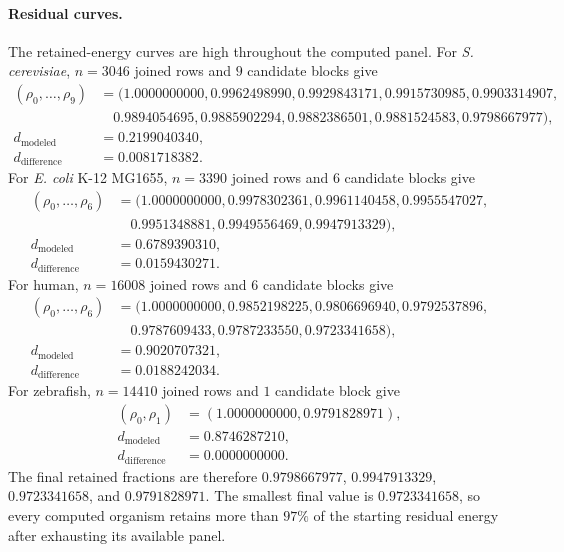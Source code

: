 \paragraph{Residual curves.}
The retained-energy curves are high throughout the computed panel.  For \textit{S. cerevisiae}, $n=3046$ joined rows and $9$ candidate blocks give
$$
\begin{aligned}
(\rho_0,\ldots,\rho_9)
&=(1.0000000000,0.9962498990,0.9929843171,0.9915730985,0.9903314907,\\
&\quad 0.9894054695,0.9885902294,0.9882386501,0.9881524583,0.9798667977),\\
d_{\mathrm{modeled}}&=0.2199040340,\\
d_{\mathrm{difference}}&=0.0081718382.
\end{aligned}
$$
For \textit{E. coli} K-12 MG1655, $n=3390$ joined rows and $6$ candidate blocks give
$$
\begin{aligned}
(\rho_0,\ldots,\rho_6)
&=(1.0000000000,0.9978302361,0.9961140458,0.9955547027,\\
&\quad 0.9951348881,0.9949556469,0.9947913329),\\
d_{\mathrm{modeled}}&=0.6789390310,\\
d_{\mathrm{difference}}&=0.0159430271.
\end{aligned}
$$
For human, $n=16008$ joined rows and $6$ candidate blocks give
$$
\begin{aligned}
(\rho_0,\ldots,\rho_6)
&=(1.0000000000,0.9852198225,0.9806696940,0.9792537896,\\
&\quad 0.9787609433,0.9787233550,0.9723341658),\\
d_{\mathrm{modeled}}&=0.9020707321,\\
d_{\mathrm{difference}}&=0.0188242034.
\end{aligned}
$$
For zebrafish, $n=14410$ joined rows and $1$ candidate block give
$$
\begin{aligned}
(\rho_0,\rho_1)&=(1.0000000000,0.9791828971),\\
d_{\mathrm{modeled}}&=0.8746287210,\\
d_{\mathrm{difference}}&=0.0000000000.
\end{aligned}
$$
The final retained fractions are therefore $0.9798667977$, $0.9947913329$, $0.9723341658$, and $0.9791828971$.  The smallest final value is $0.9723341658$, so every computed organism retains more than $97\%$ of the starting residual energy after exhausting its available panel.

